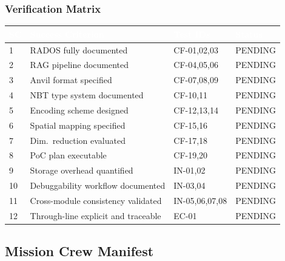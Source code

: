 \documentclass[11pt,letterpaper]{article}
\newcommand{\tableheader}[1]{\textbf{\sffamily\textcolor{white}{#1}}}
\begin{document}
\subsubsection{Verification Matrix}

\begin{center}
\begin{tabularx}{\textwidth}{L{1cm}L{5.5cm}L{3cm}C{1.5cm}}
\toprule
{}
\tableheader{SC} & \tableheader{Success Criterion} & \tableheader{Test IDs} & \tableheader{Status} \\
 & RADOS fully documented & CF-01,02,03 & PENDING \\
2 & RAG pipeline documented & CF-04,05,06 & PENDING \\
3 & Anvil format specified & CF-07,08,09 & PENDING \\
4 & NBT type system documented & CF-10,11 & PENDING \\
5 & Encoding scheme designed & CF-12,13,14 & PENDING \\
6 & Spatial mapping specified & CF-15,16 & PENDING \\
7 & Dim.\ reduction evaluated & CF-17,18 & PENDING \\
8 & PoC plan executable & CF-19,20 & PENDING \\
9 & Storage overhead quantified & IN-01,02 & PENDING \\
10 & Debuggability workflow documented & IN-03,04 & PENDING \\
11 & Cross-module consistency validated & IN-05,06,07,08 & PENDING \\
12 & Through-line explicit and traceable & EC-01 & PENDING \\
\bottomrule
\end{tabularx}
\end{center}

\subsection{Mission Crew Manifest}
\end{document}
